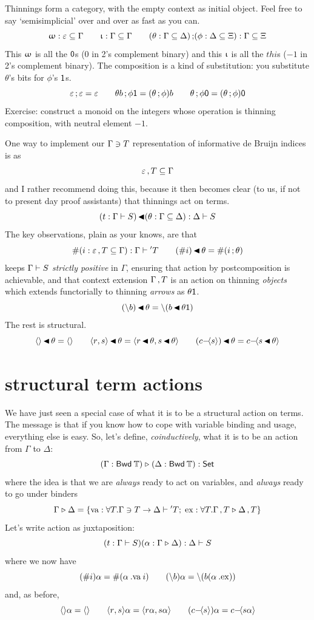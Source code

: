 \documentclass{book}
\newcommand{\D}[1]{\blue{\ensuremath{\mathsf{#1}}}}
\newcommand{\C}[1]{\red{\ensuremath{\mathsf{#1}}}}
\newcommand{\F}[1]{\green{\ensuremath{\mathrm{#1}}}}
\newcommand{\N}[1]{\black{\ensuremath{#1}}}
\newcommand{\SET}{\D{\mathsf{Set}}}
\newcommand{\vd}{\C{\langle\rangle}}
\newcommand{\pr}[2]{\red{\langle\N{#1},\N{#2}\rangle}}
\begin{document}
\newcommand{\thii}{\C{\upiota}}
\newcommand{\thoo}{\C{\upomega}}
\newcommand{\thc}{\mathop{\green{;}}}
Thinnings form a category, with the empty context as initial object. Feel free to say `semisimplicial' over and over as fast as you can.
\[
\thoo:\emp\thin\Gamma \qquad
\thii:\Gamma\thin\Gamma \qquad
(\theta:\Gamma\thin\Delta)\thc(\phi:\Delta\thin\Xi):\Gamma\thin\Xi
\]
This $\thoo$ is all the $\tho$s ($0$ in 2's complement binary) and this $\thii$ is all the $thi$s ($-1$ in 2's complement binary).
The composition is a kind of substitution: you substitute $\theta$'s bits for $\phi$'s $\thi$s.
\[
\emp\thc\emp = \emp \qquad
\theta b\thc\phi\thi = (\theta\thc\phi)b \qquad
\theta\thc\phi\tho = (\theta\thc\phi)\tho
\]
Exercise: construct a monoid on the integers whose operation is thinning composition, with neutral element $-1$.

One way to implement our $\Gamma\vni T$ representation of informative de Bruijn indices is as
\[\emp\snoc T\thin\Gamma\]
and I rather recommend doing this, because it then becomes clear (to us, if not to present day proof assistants) that thinnings act on terms.
\newcommand{\tha}{\mathop{\green{\blacktriangleleft}}}
\[
(t:\Gamma\tm S)\tha(\theta:\Gamma\thin\Delta) : \Delta\tm S
\]
The key observations, plain as your knows, are that
\[
\va{(i:\emp\snoc T\thin\Gamma)}:\Gamma\tm \stm{T} \qquad
(\va{i})\tha\theta = \va{(i\thc\theta)}
\]
keeps $\Gamma\tm S$ \emph{strictly positive} in $\Gamma$, ensuring that action by postcomposition is achievable, and that context extension $\Gamma\snoc T$ is an action on thinning \emph{objects} which extends functorially to thinning \emph{arrows} as $\theta\thi$.
\[
(\slam b)\tha\theta = \slam(b\tha\theta\thi)
\]
The rest is structural.
\[
\vd\tha\theta = \vd \qquad
\pr{r}{s}\tha\theta = \pr{r\tha\theta}{s\tha\theta} \qquad
(\cn{c}{s})\tha\theta = \cn{c}{s\tha\theta}
\]


\section{structural term actions}

\newcommand{\tma}{\mathrel{\D{\triangleright}}}
We have just seen a special case of what it is to be a structural action on terms. The message is that if you know how to cope with variable binding and usage, everything else is easy. So, let's define, \emph{coinductively}, what it is to be an action from $\Gamma$ to $\Delta$:
\[
(\Gamma:\Bwd\TmS)\tma(\Delta:\Bwd\TmS) : \SET
\]
where the idea is that we are \emph{always} ready to act on variables, and \emph{always} ready to go under binders
\[\Gamma\tma\Delta =
\{\F{va}:\forall T.\Gamma\vni T \to \Delta\tm \stm{T};\;
\F{ex}:\forall T.\Gamma\snoc T\tma\Delta\snoc T
\}
\]
Let's write action as juxtaposition:
\[
(t:\Gamma\tm S)(\alpha:\Gamma\tma\Delta) : \Delta\tm S
\]
where we now have
\[
(\va{i})\alpha = \va{(\alpha\:.\F{va}\:i)}\qquad
(\slam b)\alpha = \slam(b(\alpha\:.\F{ex}))
\]
and, as before,
\[
\vd\alpha = \vd \qquad
\pr{r}{s}\alpha = \pr{r\alpha}{s\alpha} \qquad
(\cn{c}{s})\alpha = \cn{c}{s\alpha}
\]
\end{document}
